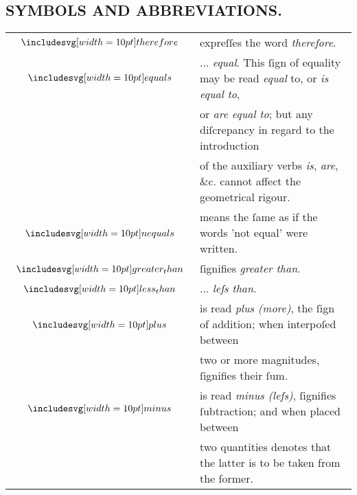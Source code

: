 \begin{center}
    \begin{minipage}{0.8\textwidth}
        \subsection[Symbols and Abbreviations]{\centering \scshape{\LARGE{SYMBOLS AND ABBREVIATIONS.}}}
        \label{subsec:symbolsandabbreviations}

        \hfill

        \hfill

        \begin{tabular}{c l}
            $\btherefore$              & expreſſes the word \textit{therefore}.                                                                \\
            $\bequals$                 & $\dots$ \textit{equal}. This ſign of equality may be read \textit{equal} to, or \textit{is equal to}, \\
                                       & or \textit{are equal to}; but any diſcrepancy in regard to the introduction                           \\
                                       & of the auxiliary verbs \textit{is}, \textit{are}, \&c. cannot affect the geometrical rigour.          \\
            $\bnequals$                & means the ſame as if the words 'not equal' were written.                                              \\
            $\bgt$                     & ſignifies \textit{greater than}.                                                                      \\
            $\blt$                     & $\dots$ \textit{leſs than}.                                                                           \\
            $\bplus$                   & is read \textit{plus (more)}, the ſign of addition; when interpoſed between                           \\
                                       & two or more magnitudes, ſignifies their ſum.                                                          \\
            $\bminus$                  & is read \textit{minus (leſs)}, ſignifies ſubtraction; and when placed between                         \\
                                       & two quantities denotes that the latter is to be taken from the former.                                \\

\end{tabular}
\end{minipage}
\end{center}
